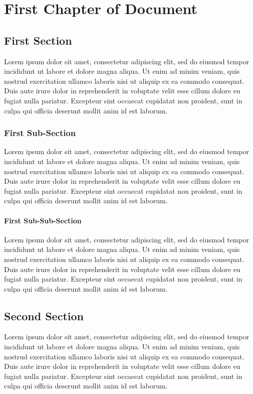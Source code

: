 \chapter{First Chapter of Document}
\section{First Section}
Lorem ipsum dolor sit amet, consectetur adipiscing elit, sed do eiusmod tempor incididunt ut labore et dolore magna aliqua. Ut enim ad minim veniam, quis nostrud exercitation ullamco laboris nisi ut aliquip ex ea commodo consequat. Duis aute irure dolor in reprehenderit in voluptate velit esse cillum dolore eu fugiat nulla pariatur. Excepteur sint occaecat cupidatat non proident, sunt in culpa qui officia deserunt mollit anim id est laborum.

\subsection{First Sub-Section}
Lorem ipsum dolor sit amet, consectetur adipiscing elit, sed do eiusmod tempor incididunt ut labore et dolore magna aliqua. Ut enim ad minim veniam, quis nostrud exercitation ullamco laboris nisi ut aliquip ex ea commodo consequat. Duis aute irure dolor in reprehenderit in voluptate velit esse cillum dolore eu fugiat nulla pariatur. Excepteur sint occaecat cupidatat non proident, sunt in culpa qui officia deserunt mollit anim id est laborum.
\subsubsection{First Sub-Sub-Section}
Lorem ipsum dolor sit amet, consectetur adipiscing elit, sed do eiusmod tempor incididunt ut labore et dolore magna aliqua. Ut enim ad minim veniam, quis nostrud exercitation ullamco laboris nisi ut aliquip ex ea commodo consequat. Duis aute irure dolor in reprehenderit in voluptate velit esse cillum dolore eu fugiat nulla pariatur. Excepteur sint occaecat cupidatat non proident, sunt in culpa qui officia deserunt mollit anim id est laborum.
\section{Second Section}
Lorem ipsum dolor sit amet, consectetur adipiscing elit, sed do eiusmod tempor incididunt ut labore et dolore magna aliqua. Ut enim ad minim veniam, quis nostrud exercitation ullamco laboris nisi ut aliquip ex ea commodo consequat. Duis aute irure dolor in reprehenderit in voluptate velit esse cillum dolore eu fugiat nulla pariatur. Excepteur sint occaecat cupidatat non proident, sunt in culpa qui officia deserunt mollit anim id est laborum.


